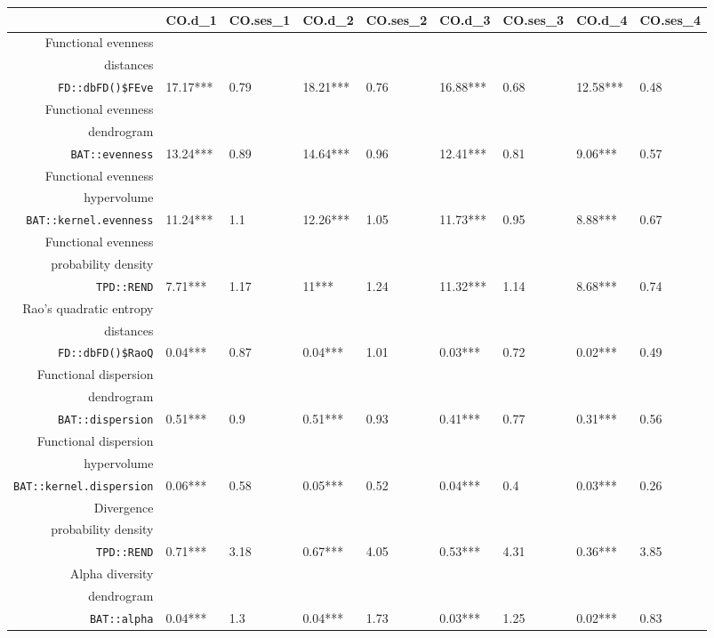 \begin{table}[ht]
\scriptsize
\centering
\begin{tabular}{rllllllll}
  \hline
 & CO.d\_1 & CO.ses\_1 & CO.d\_2 & CO.ses\_2 & CO.d\_3 & CO.ses\_3 & CO.d\_4 & CO.ses\_4 \\ 
  \hline
Functional evenness\\distances\\\texttt{FD::dbFD()\$FEve} & 17.17*** & 0.79 & 18.21*** & 0.76 & 16.88*** & 0.68 & 12.58*** & 0.48 \\ 
  Functional evenness\\dendrogram\\\texttt{BAT::evenness} & 13.24*** & 0.89 & 14.64*** & 0.96 & 12.41*** & 0.81 & 9.06*** & 0.57 \\ 
  Functional evenness\\hypervolume\\\texttt{BAT::kernel.evenness} & 11.24*** & 1.1 & 12.26*** & 1.05 & 11.73*** & 0.95 & 8.88*** & 0.67 \\ 
  Functional evenness\\probability density\\\texttt{TPD::REND} & 7.71*** & 1.17 & 11*** & 1.24 & 11.32*** & 1.14 & 8.68*** & 0.74 \\ 
  Rao's quadratic entropy\\distances\\\texttt{FD::dbFD()\$RaoQ} & 0.04*** & 0.87 & 0.04*** & 1.01 & 0.03*** & 0.72 & 0.02*** & 0.49 \\ 
  Functional dispersion\\dendrogram\\\texttt{BAT::dispersion} & 0.51*** & 0.9 & 0.51*** & 0.93 & 0.41*** & 0.77 & 0.31*** & 0.56 \\ 
  Functional dispersion\\hypervolume\\\texttt{BAT::kernel.dispersion} & 0.06*** & 0.58 & 0.05*** & 0.52 & 0.04*** & 0.4 & 0.03*** & 0.26 \\ 
  Divergence\\probability density\\\texttt{TPD::REND} & 0.71*** & 3.18 & 0.67*** & 4.05 & 0.53*** & 4.31 & 0.36*** & 3.85 \\ 
  Alpha diversity\\dendrogram\\\texttt{BAT::alpha} & 0.04*** & 1.3 & 0.04*** & 1.73 & 0.03*** & 1.25 & 0.02*** & 0.83 \\ 

\end{tabular}
\end{table}
